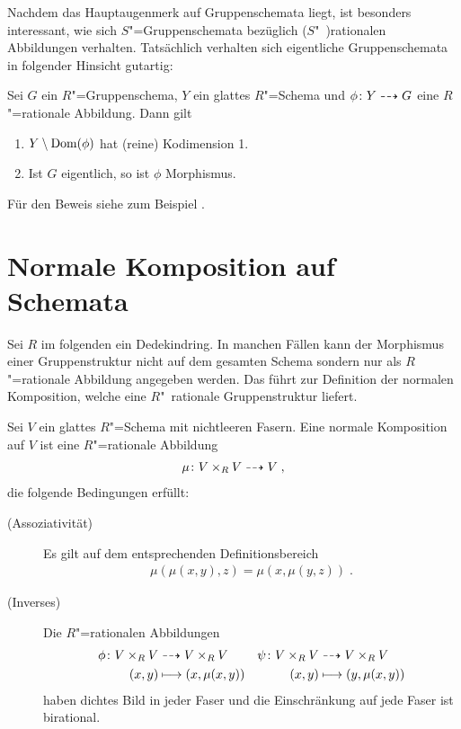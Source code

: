 Nachdem das Hauptaugenmerk auf Gruppenschemata liegt, ist
besonders interessant, wie sich $S$"=Gruppenschemata
bezüglich ($S$"~)rationalen Abbildungen verhalten.
Tatsächlich verhalten sich eigentliche Gruppenschemata in folgender
Hinsicht gutartig:
\begin{Theorem}
  \label{thm:rationalzumorphismus}
  Sei $G$ ein $R$"=Gruppenschema, $Y$ ein glattes $R$"=Schema und
  $\phi\colon Y\dashrightarrow G$ eine $R$"=rationale Abbildung.
  Dann gilt
  \begin{enumerate}[label=(\alph*)]
  \item $Y\setminus \operatorname{Dom}(\phi)$ hat (reine) Kodimension 1.
  \item Ist $G$ eigentlich, so ist $\phi$ Morphismus.
  \end{enumerate}
\end{Theorem}
Für den Beweis siehe zum Beispiel \cite[Proposition~IV.6.2]{silverman2}.


\section{Normale Komposition auf Schemata}
Sei $R$ im folgenden ein Dedekindring.
In manchen Fällen kann der Morphismus einer Gruppenstruktur nicht auf
dem gesamten Schema sondern nur als $R$"=rationale Abbildung angegeben
werden. Das führt zur Definition der normalen Komposition, welche
eine $R$"~ra\-tio\-na\-le Gruppenstruktur liefert.
\begin{Definition}\label{def:normalekomposition}
  Sei $V$ ein glattes $R$"=Schema mit nichtleeren Fasern.
  Eine normale Komposition auf $V$ ist eine $R$"=rationale
  Abbildung
  \begin{gather*}
    \mu\colon V\times_R V\dashrightarrow V\;,
  \end{gather*}
  die folgende Bedingungen erfüllt:
  \begin{description}
  \item[(Assoziativität)] Es gilt auf dem entsprechenden
    Definitionsbereich
    \begin{gather*}
      \mu(\mu(x,y),z)=\mu(x,\mu(y,z))\;.
    \end{gather*}
  \item[(Inverses)]
    Die $R$"=rationalen Abbildungen
    \begin{align*}
      \phi\colon V\times_R V
      &\dra V\times_R V
      &\psi\colon V\times_R V
      & \dra V\times_R V\\
      (x,y)
      &\longmapsto (x,\mu(x,y))
      &(x,y)
      &\longmapsto (y,\mu(x,y))       
    \end{align*}
    haben dichtes Bild in jeder Faser und die Einschränkung auf jede
    Faser ist birational.
  \end{description}
\end{Definition}

